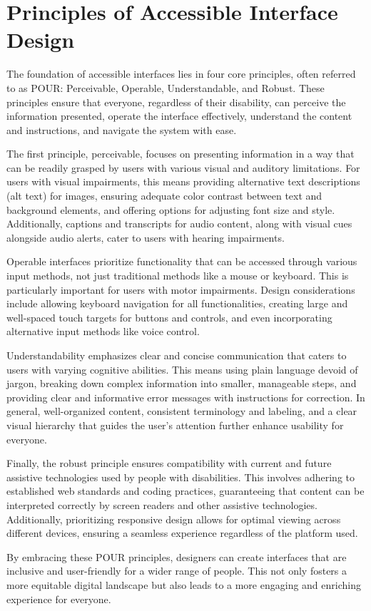 \section{Principles of Accessible Interface Design}

The foundation of accessible interfaces lies in four core principles, often
referred to as POUR: Perceivable, Operable, Understandable, and Robust. These
principles ensure that everyone, regardless of their disability, can perceive
the information presented, operate the interface effectively, understand the
content and instructions, and navigate the system with ease.

The first principle, perceivable, focuses on presenting information in a way
that can be readily grasped by users with various visual and auditory
limitations. For users with visual impairments, this means providing alternative
text descriptions (alt text) for images, ensuring adequate color contrast
between text and background elements, and offering options for adjusting font
size and style. Additionally, captions and transcripts for audio content, along
with visual cues alongside audio alerts, cater to users with hearing
impairments.

Operable interfaces prioritize functionality that can be accessed through
various input methods, not just traditional methods like a mouse or keyboard.
This is particularly important for users with motor impairments. Design
considerations include allowing keyboard navigation for all functionalities,
creating large and well-spaced touch targets for buttons and controls, and even
incorporating alternative input methods like voice control.

Understandability emphasizes clear and concise communication that caters to
users with varying cognitive abilities. This means using plain language devoid
of jargon, breaking down complex information into smaller, manageable steps, and
providing clear and informative error messages with instructions for correction.
In general, well-organized content, consistent terminology and labeling, and a
clear visual hierarchy that guides the user's attention further enhance
usability for everyone.

Finally, the robust principle ensures compatibility with current and future
assistive technologies used by people with disabilities. This involves adhering
to established web standards and coding practices, guaranteeing that content can
be interpreted correctly by screen readers and other assistive technologies.
Additionally, prioritizing responsive design allows for optimal viewing across
different devices, ensuring a seamless experience regardless of the platform
used.

By embracing these POUR principles, designers can create interfaces that are
inclusive and user-friendly for a wider range of people. This not only fosters a
more equitable digital landscape but also leads to a more engaging and enriching
experience for everyone.
